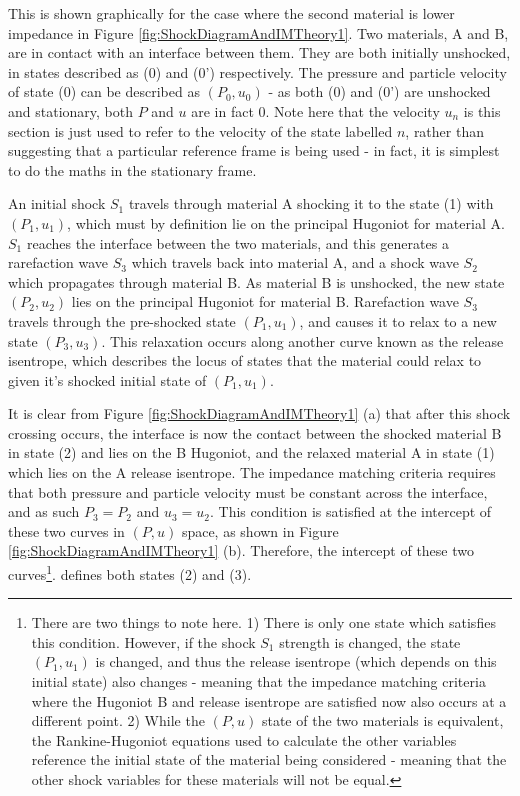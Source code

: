 This is shown graphically for the case where the second material is lower impedance in Figure \ref{fig:ShockDiagramAndIMTheory1}. Two materials, A and B, are in contact with an interface between them. They are both initially unshocked, in states described as (0) and (0') respectively. The pressure and particle velocity of state (0) can be described as $(P_0, u_0)$ - as both (0) and (0') are unshocked and stationary, both $P$ and $u$ are in fact 0. Note here that the velocity $u_n$ is this section is just used to refer to the velocity of the state labelled $n$, rather than suggesting that a particular reference frame is being used - in fact, it is simplest to do the maths in the stationary frame.

An initial shock $S_1$ travels through material A shocking it to the state (1) with $(P_1, u_1)$, which must by definition lie on the principal Hugoniot for material A. $S_1$ reaches the interface between the two materials, and this generates a rarefaction wave $S_3$ which travels back into material A, and a shock wave $S_2$ which propagates through material B. As material B is unshocked, the new state $(P_2, u_2)$ lies on the principal Hugoniot for material B. Rarefaction wave $S_3$ travels through the pre-shocked state $(P_1, u_1)$, and causes it to relax to a new state $(P_3, u_3)$. This relaxation occurs along another curve known as the release isentrope, which describes the locus of states that the material could relax to given it's shocked initial state of $(P_1, u_1)$. 

It is clear from Figure \ref{fig:ShockDiagramAndIMTheory1} (a) that after this shock crossing occurs, the interface is now the contact between the shocked material B in state (2) and lies on the B Hugoniot, and the relaxed material A in state (1) which lies on the A release isentrope. The impedance matching criteria requires that both pressure and particle velocity must be constant across the interface, and as such $P_3 = P_2$ and $u_3 = u_2$. This condition is satisfied at the intercept of these two curves in $(P, u)$ space, as shown in Figure \ref{fig:ShockDiagramAndIMTheory1} (b). Therefore, the intercept of these two curves\footnote{There are two things to note here. 1) There is only one state which satisfies this condition. However, if the shock $S_1$ strength is changed, the state $(P_1, u_1)$ is changed, and thus the release isentrope (which depends on this initial state) also changes - meaning that the impedance matching criteria where the Hugoniot B and release isentrope are satisfied now also occurs at a different point. 2) While the $(P,u)$ state of the two materials is equivalent, the Rankine-Hugoniot equations used to calculate the other variables reference the initial state of the material being considered - meaning that the other shock variables for these materials will not be equal.}. defines both states (2) and (3). 


